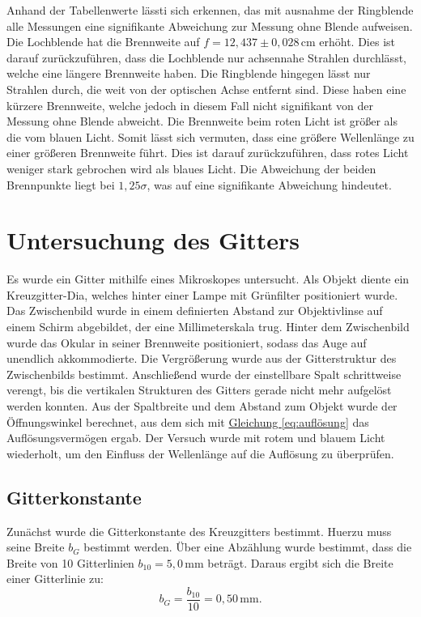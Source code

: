 Anhand der Tabellenwerte lässti sich erkennen, das mit ausnahme der Ringblende alle Messungen eine signifikante Abweichung zur Messung ohne Blende aufweisen. Die Lochblende hat die Brennweite auf $f = 12{,}437 \pm 0{,}028\,\mathrm{cm}$ erhöht. Dies ist darauf zurückzuführen, dass die Lochblende nur achsennahe Strahlen durchlässt, welche eine längere Brennweite haben. Die Ringblende hingegen lässt nur Strahlen durch, die weit von der optischen Achse entfernt sind. Diese haben eine kürzere Brennweite, welche jedoch in diesem Fall nicht signifikant von der Messung ohne Blende abweicht. 
Die Brennweite beim roten Licht ist größer als die vom blauen Licht. Somit lässt sich vermuten, dass eine größere Wellenlänge zu einer größeren Brennweite führt. Dies ist darauf zurückzuführen, dass rotes Licht weniger stark gebrochen wird als blaues Licht. Die Abweichung der beiden Brennpunkte liegt bei $1,25\sigma$, was auf eine signifikante Abweichung hindeutet.

\section{Untersuchung des Gitters}
\label{sec:auswertung_mikroskop}

Es wurde ein Gitter mithilfe eines Mikroskopes untersucht. Als Objekt diente ein Kreuzgitter-Dia, welches hinter einer Lampe mit Grünfilter positioniert wurde. Das Zwischenbild wurde in einem definierten Abstand zur Objektivlinse auf einem Schirm abgebildet, der eine Millimeterskala trug. Hinter dem Zwischenbild wurde das Okular in seiner Brennweite positioniert, sodass das Auge auf unendlich akkommodierte. Die Vergrößerung wurde aus der Gitterstruktur des Zwischenbilds bestimmt. Anschließend wurde der einstellbare Spalt schrittweise verengt, bis die vertikalen Strukturen des Gitters gerade nicht mehr aufgelöst werden konnten. Aus der Spaltbreite und dem Abstand zum Objekt wurde der Öffnungswinkel berechnet, aus dem sich mit \hyperref[eq:auflösung]{Gleichung \ref*{eq:auflösung}} das Auflösungsvermögen ergab. Der Versuch wurde mit rotem und blauem Licht wiederholt, um den Einfluss der Wellenlänge auf die Auflösung zu überprüfen.

\subsection{Gitterkonstante}
\label{ssec:gitter}
Zunächst wurde die Gitterkonstante des Kreuzgitters bestimmt. Huerzu muss seine Breite $b_G$ bestimmt werden. Über eine Abzählung wurde bestimmt, dass die Breite von 10 Gitterlinien $b_{10} = 5{,}0\,\mathrm{mm}$ beträgt. Daraus ergibt sich die Breite einer Gitterlinie zu:
\begin{equation}
    b_G = \frac{b_{10}}{10} = 0{,}50\,\mathrm{mm}.
\end{equation}

